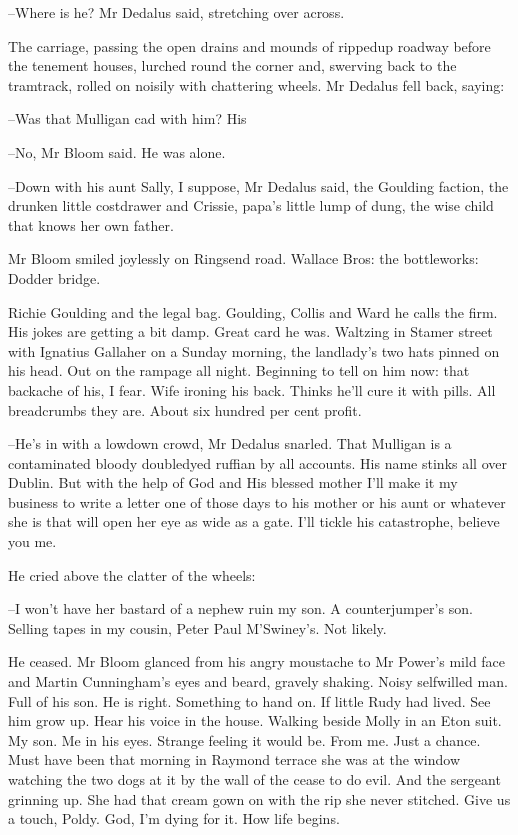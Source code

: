 --Where is he?
Mr Dedalus said,
stretching over across.

The carriage, passing the open drains and mounds of rippedup roadway
before the tenement houses,
lurched round the corner
and, swerving back to the tramtrack, rolled on noisily with chattering wheels.
Mr Dedalus fell back, saying:

--Was that Mulligan cad with him?
His 

--No,
Mr Bloom said.
He was alone.

--Down with his aunt Sally, I suppose,
Mr Dedalus said,
the Goulding faction,
the drunken little costdrawer
and Crissie, papa's little lump of dung,
the wise child that knows her own father.

Mr Bloom smiled joylessly on Ringsend road.
Wallace Bros:
the bottleworks:
Dodder bridge.

Richie Goulding and the legal bag.
Goulding, Collis and Ward he calls the firm.
His jokes are getting a bit damp.
Great card he was.
Waltzing in Stamer street with Ignatius Gallaher on a Sunday morning,
the landlady's two hats pinned on his head.
Out on the rampage all night.
Beginning to tell on him now:
that backache of his, I fear.
Wife ironing his back.
Thinks he'll cure it with pills.
All breadcrumbs they are.
About six hundred per cent profit.

--He's in with a lowdown crowd,
Mr Dedalus snarled.
That Mulligan is a contaminated bloody doubledyed ruffian by all accounts.
His name stinks all over Dublin.
But with the help of God and His blessed mother
I'll make it my business to write a letter
one of those days
to his mother or his aunt or whatever she is
that will open her eye as wide as a gate.
I'll tickle his catastrophe, believe you me.

He cried above the clatter of the wheels:

--I won't have her bastard of a nephew ruin my son.
A counterjumper's son.
Selling tapes in my cousin, Peter Paul M'Swiney's.
Not likely.

He ceased.
Mr Bloom glanced from his angry moustache
to Mr Power's mild face
and Martin Cunningham's eyes and beard,
gravely shaking.
Noisy selfwilled man.
Full of his son.
He is right.
Something to hand on.
If little Rudy had lived.
See him grow up.
Hear his voice in the house.
Walking beside Molly in an Eton suit.
My son.
Me in his eyes.
Strange feeling it would be.
From me.
Just a chance.
Must have been that morning in Raymond terrace
she was at the window watching the two dogs at it
by the wall of the cease to do evil.
And the sergeant grinning up.
She had that cream gown on with the rip she never stitched.
Give us a touch, Poldy.
God, I'm dying for it.
How life begins.

